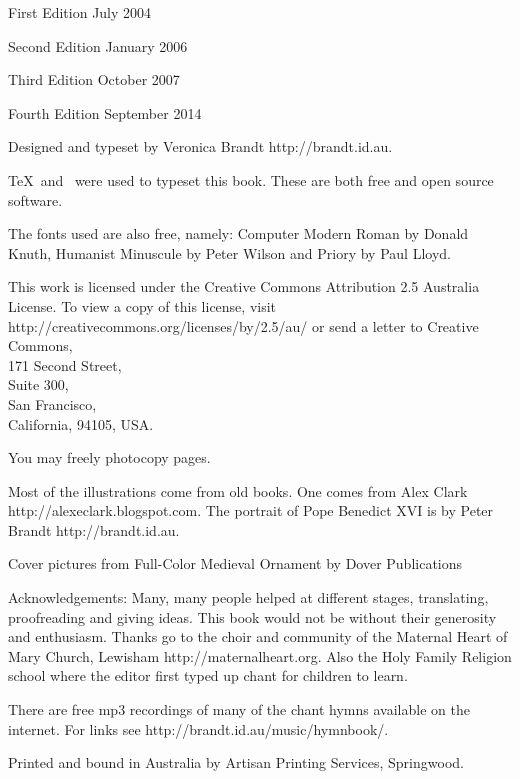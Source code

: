 {\rmlyrics

\raggedright
{}

\parindent=0mm
\parskip=6pt

First Edition July 2004

Second Edition January 2006

Third Edition October 2007


Fourth Edition September 2014

Designed and typeset by Veronica Brandt http://brandt.id.au.

\TeX\ and \OpusTeX\ were used to typeset this book.  
These are both free and open source software.

The fonts used are also free, namely:
          Computer Modern Roman by Donald Knuth,
          Humanist Minuscule by Peter Wilson
          and Priory by Paul Lloyd.


This work is licensed under the Creative Commons 
Attribution 2.5 Australia License. 
To view a copy of this license, visit 
http://creativecommons.org/licenses/by/2.5/au/ 
or send a letter to 
Creative Commons, \\
171 Second Street, \\
Suite 300, \\
San Francisco,\\
California, 94105, USA.

You may freely photocopy pages.

Most of the illustrations come from old books.
One comes from Alex Clark http://alexeclark.blogspot.com.
The portrait of Pope Benedict XVI is by
Peter Brandt
http://brandt.id.au.

Cover pictures from Full-Color Medieval Ornament by
Dover Publications

Acknowledgements:  Many, many people helped at different stages,
translating, proofreading and giving ideas.  This book would not
be without their generosity and enthusiasm.
Thanks go to the choir and community of the Maternal Heart of Mary
Church, Lewisham http://maternalheart.org.  Also the Holy Family 
Religion school where the editor first typed up chant for children
to learn. 

There are free mp3 recordings of many of the chant hymns available
on the internet.  For links see http://brandt.id.au/music/hymnbook/.

Printed and bound in Australia by Artisan Printing Services, Springwood.

\vfill

}

